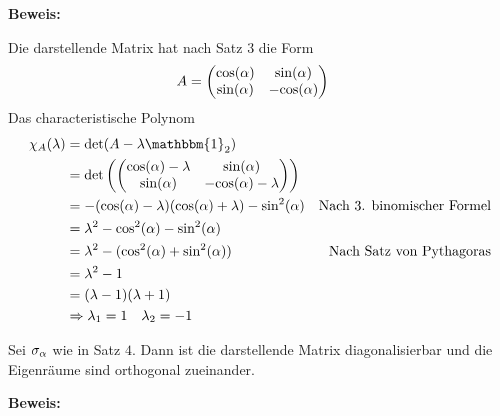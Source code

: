 \vspace{0.3cm}

\textbf{Beweis:}

Die darstellende Matrix hat nach Satz 3 die Form
\begin{align*}
    A &= \begin{pmatrix}
        \text{cos}(\alpha) & \text{sin}(\alpha) \\
        \text{sin}(\alpha) & -\text{cos}(\alpha)
    \end{pmatrix}
\end{align*}
Das characteristische Polynom
\begin{align*}
    \chi _A(\lambda) &= \text{det}(A - \lambda \mathbbm{1}_2) \\
    &= \text{det}\left(\begin{pmatrix}
        \cosa - \lambda & \sina \\
        \sina & -\cosa - \lambda
    \end{pmatrix}\right) \\
    &= -(\cosa - \lambda)(\cosa + \lambda) - \text{sin}^2(\alpha)&\text{Nach 3. binomischer Formel} \\
    &= \lambda ^2 - \text{cos}^2(\alpha) - \text{sin}^2(\alpha) \\
    &= \lambda ^2 - (\text{cos}^2(\alpha) + \text{sin}^2(\alpha))&\text{Nach Satz von Pythagoras} \\
    &= \lambda ^2 - 1 \\
    &= (\lambda - 1)(\lambda + 1) \\
    &\Rightarrow \lambda _1 = 1 \quad \lambda _2 = -1
\end{align*}

Sei $\sigma_{\alpha}$ wie in Satz $4$. Dann ist die darstellende Matrix diagonalisierbar und die Eigenräume sind orthogonal zueinander.

\vspace{0.3cm}

\textbf{Beweis:}

